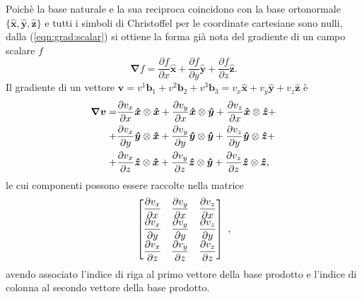 \begin{example}
 Poichè la base naturale e la sua reciproca coincidono con la base ortonormale $\{\bm{\hat{x}}, \bm{\hat{y}}, \bm{\hat{z}}\}$ e tutti i simboli di Christoffel per le coordinate cartesiane sono nulli, dalla (\ref{eqn:grad:scalar}) si ottiene la forma già nota del gradiente di un campo scalare $f$
\begin{equation}
 \bm{\nabla} f = \dfrac{\partial f}{\partial x} \bm{\hat{x}} +
                 \dfrac{\partial f}{\partial y} \bm{\hat{y}} +
                 \dfrac{\partial f}{\partial z} \bm{\hat{z}} .
\end{equation}
Il gradiente di un vettore $\bm{v} = v^1 \bm{b}_1 +v^2 \bm{b}_2 + v^3 \bm{b}_3  = v_x \bm{\hat{x}} + v_y \bm{\hat{y}} + v_z \bm{\hat{z}}$ è
\begin{equation}
 \begin{aligned}
  \bm{\nabla} \bm{v} = & \dfrac{\partial v_x}{\partial x} \bm{\hat{x}}\otimes\bm{\hat{x}} + 
                         \dfrac{\partial v_y}{\partial x} \bm{\hat{x}}\otimes\bm{\hat{y}} +
                         \dfrac{\partial v_z}{\partial x} \bm{\hat{x}}\otimes\bm{\hat{z}} + \\ 
                     + & \dfrac{\partial v_x}{\partial y} \bm{\hat{y}}\otimes\bm{\hat{x}} + 
                         \dfrac{\partial v_y}{\partial y} \bm{\hat{y}}\otimes\bm{\hat{y}} +
                         \dfrac{\partial v_z}{\partial y} \bm{\hat{y}}\otimes\bm{\hat{z}} + \\ 
                     + & \dfrac{\partial v_x}{\partial z} \bm{\hat{z}}\otimes\bm{\hat{x}} + 
                         \dfrac{\partial v_y}{\partial z} \bm{\hat{z}}\otimes\bm{\hat{y}} +
                         \dfrac{\partial v_z}{\partial z} \bm{\hat{z}}\otimes\bm{\hat{z}} , \\ 
 \end{aligned}
\end{equation}
 le cui componenti possono essere raccolte nella matrice
\begin{equation}
 \begin{bmatrix}
  \dfrac{\partial v_x}{\partial x}  & 
  \dfrac{\partial v_y}{\partial x}  &
  \dfrac{\partial v_z}{\partial x}   \\ 
  \dfrac{\partial v_x}{\partial y}  & 
  \dfrac{\partial v_y}{\partial y}  &
  \dfrac{\partial v_z}{\partial y}   \\ 
  \dfrac{\partial v_x}{\partial z}  & 
  \dfrac{\partial v_y}{\partial z}  &
  \dfrac{\partial v_z}{\partial z}   \\ 
 \end{bmatrix} \ ,
\end{equation}
avendo associato l'indice di riga al primo vettore della base prodotto e l'indice di colonna al secondo vettore della base prodotto.
\end{example}
%

